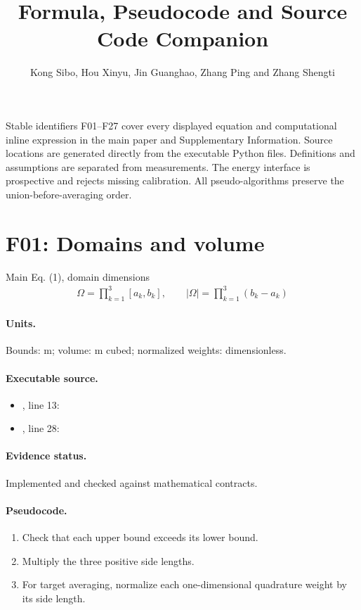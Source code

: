 \documentclass[10pt]{article}
\title{Formula, Pseudocode and Source Code Companion}
\author{Kong Sibo, Hou Xinyu, Jin Guanghao, Zhang Ping and Zhang Shengti}\date{}
\begin{document}
\maketitle
Stable identifiers F01--F27 cover every displayed equation and computational inline expression in the main paper and Supplementary Information. Source locations are generated directly from the executable Python files. Definitions and assumptions are separated from measurements. The energy interface is prospective and rejects missing calibration. All pseudo-algorithms preserve the union-before-averaging order.
\section*{F01: Domains and volume}
Main Eq. (1), domain dimensions
\begin{gather*}\Omega=\prod_{k=1}^{3}[a_k,b_k],\qquad |\Omega|=\prod_{k=1}^{3}(b_k-a_k)\end{gather*}
\paragraph{Units.} Bounds: m; volume: m cubed; normalized weights: dimensionless.
\paragraph{Executable source.}
\begin{itemize}[leftmargin=*]
\item {}, line 13: 
\item {}, line 28: 
\end{itemize}
\paragraph{Evidence status.} Implemented and checked against mathematical contracts.
\paragraph{Pseudocode.}
\begin{enumerate}[leftmargin=*]
\item Check that each upper bound exceeds its lower bound.
\item Multiply the three positive side lengths.
\item For target averaging, normalize each one-dimensional quadrature weight by its side length.
\end{enumerate}
\newpage
\end{document}
